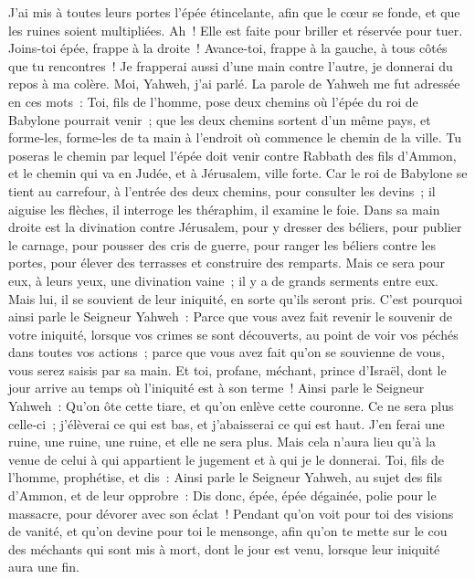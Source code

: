 \begin{multicols}{2}
J'ai mis à toutes leurs portes l'épée étincelante, afin que le cœur se fonde, et que les ruines soient multipliées. Ah~! Elle est faite pour briller et réservée pour tuer.
Joins-toi épée, frappe à la droite~! Avance-toi, frappe à la gauche, à tous côtés que tu rencontres~!
Je frapperai aussi d'une main contre l'autre, je donnerai du repos à ma colère. Moi, Yahweh, j'ai parlé.
La parole de Yahweh me fut adressée en ces mots~:
Toi, fils de l'homme, pose deux chemins où l'épée du roi de Babylone pourrait venir~; que les deux chemins sortent d'un même pays, et forme-les, forme-les de ta main à l'endroit où commence le chemin de la ville.
Tu poseras le chemin par lequel l'épée doit venir contre Rabbath des fils d'Ammon, et le chemin qui va en Judée, et à Jérusalem, ville forte.
Car le roi de Babylone se tient au carrefour, à l'entrée des deux chemins, pour consulter les devins~; il aiguise les flèches, il interroge les théraphim, il examine le foie.
Dans sa main droite est la divination contre Jérusalem, pour y dresser des béliers, pour publier le carnage, pour pousser des cris de guerre, pour ranger les béliers contre les portes, pour élever des terrasses et construire des remparts.
Mais ce sera pour eux, à leurs yeux, une divination vaine~; il y a de grands serments entre eux. Mais lui, il se souvient de leur iniquité, en sorte qu'ils seront pris.
C'est pourquoi ainsi parle le Seigneur Yahweh~: Parce que vous avez fait revenir le souvenir de votre iniquité, lorsque vos crimes se sont découverts, au point de voir vos péchés dans toutes vos actions~; parce que vous avez fait qu'on se souvienne de vous, vous serez saisis par sa main.
Et toi, profane, méchant, prince d'Israël, dont le jour arrive au temps où l'iniquité est à son terme~!
Ainsi parle le Seigneur Yahweh~: Qu'on ôte cette tiare, et qu'on enlève cette couronne. Ce ne sera plus celle-ci~; j'élèverai ce qui est bas, et j'abaisserai ce qui est haut.
J'en ferai une ruine, une ruine, une ruine, et elle ne sera plus. Mais cela n'aura lieu qu'à la venue de celui à qui appartient le jugement et à qui je le donnerai.
Toi, fils de l'homme, prophétise, et dis~: Ainsi parle le Seigneur Yahweh, au sujet des fils d'Ammon, et de leur opprobre~: Dis donc, épée, épée dégainée, polie pour le massacre, pour dévorer avec son éclat~!
Pendant qu'on voit pour toi des visions de vanité, et qu'on devine pour toi le mensonge, afin qu'on te mette sur le cou des méchants qui sont mis à mort, dont le jour est venu, lorsque leur iniquité aura une fin.

\end{multicols}
